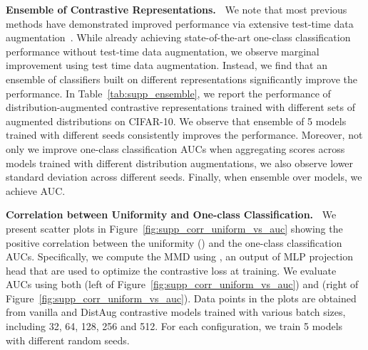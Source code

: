 \documentclass{article} \usepackage{iclr2021_conference,times}
\begin{document}
\textbf{Ensemble of Contrastive Representations.~}
We note that most previous methods have demonstrated improved performance via extensive test-time data augmentation~\citep{golan2018deep,hendrycks2019using,bergman2020classification,tack2020csi}. While already achieving state-of-the-art one-class classification performance without test-time data augmentation, we observe marginal improvement using test time data augmentation. Instead, we find that an ensemble of classifiers built on different representations significantly improve the performance.
In Table~\ref{tab:supp_ensemble}, we report the performance of distribution-augmented contrastive representations trained with different sets of augmented distributions on CIFAR-10. We observe that ensemble of 5 models trained with different seeds consistently improves the performance. Moreover, not only we improve one-class classification AUCs when aggregating scores across models trained with different distribution augmentations, we also observe lower standard deviation across different seeds. Finally, when ensemble over  models, we achieve  AUC.

\begin{table}[ht]
    \centering
    \caption{Performance of single and ensemble models of distribution augmented contrastive representations on CIFAR-10. For each augmented distribution, we report the mean and standard deviation of single model performance (``single model'') and that of ensemble model whose ensemble score is aggregated from 5 models trained with different random seeds (``ensemble of 5 models''). ``Ensemble of 5'' aggregates score from 5 models with different augmentation distributions. }
    \label{tab:supp_ensemble}
\end{table}


\textbf{Correlation between Uniformity and One-class Classification.~}
We present scatter plots in Figure~\ref{fig:supp_corr_uniform_vs_auc} showing the positive correlation between the uniformity () and the one-class classification AUCs. Specifically, we compute the MMD using , an output of MLP projection head that are used to optimize the contrastive loss at training. We evaluate AUCs using both  (left of Figure~\ref{fig:supp_corr_uniform_vs_auc}) and  (right of Figure~\ref{fig:supp_corr_uniform_vs_auc}). Data points in the plots are obtained from vanilla and DistAug contrastive models trained with various batch sizes, including 32, 64, 128, 256 and 512. For each configuration, we train 5 models with different random seeds. 
\end{document}
